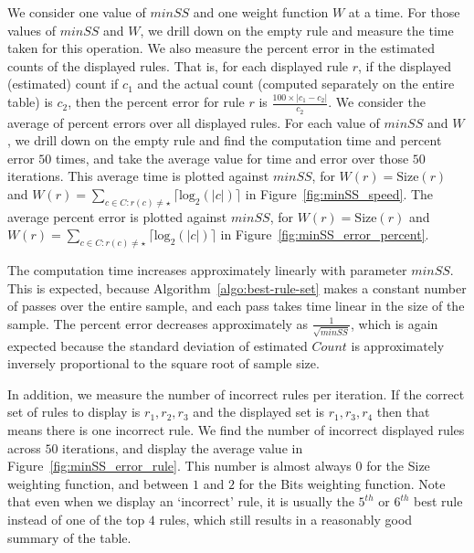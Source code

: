 We consider one value of $minSS$ and one weight function $W$ at a time. For those values of $minSS$ and $W$, we drill down on the empty rule and measure the time taken for this operation. We also measure the percent error in the estimated counts of the displayed rules. That is, for each displayed rule $r$, if the displayed (estimated) count if $c_1$ and the actual count (computed separately on the entire table) is $c_2$, then the percent error for rule $r$ is $\frac{100 \times |c_1-c_2|}{c_2}$. We consider the average of percent errors over all displayed rules. For each value of $minSS$ and $W$, we drill down on the empty rule and find the computation time and percent error $50$ times, and take the average value for time and error over those $50$ iterations. This average time is plotted against $minSS$, for $W(r) = \text{Size}(r)$ and $W(r) = \sum_{c \in C : r(c) \neq \star} \lceil \text{log}_2(|c|) \rceil$ in Figure~\ref{fig:minSS_speed}. The average percent error is plotted against $minSS$, for $W(r) = \text{Size}(r)$ and $W(r) = \sum_{c \in C : r(c) \neq \star} \lceil \text{log}_2(|c|) \rceil$ in Figure~\ref{fig:minSS_error_percent}. 

The computation time increases approximately linearly with parameter $minSS$. This is expected, because Algorithm~\ref{algo:best-rule-set} makes a constant number of passes over the entire sample, and each pass takes time linear in the size of the sample. The percent error decreases approximately as $\frac{1}{\sqrt{minSS}}$, which is again expected because the standard deviation of estimated $Count$ is approximately inversely proportional to the square root of sample size.

In addition, we measure the number of incorrect rules per iteration. If the correct set of rules to display is $r_1, r_2, r_3$ and the displayed set is $r_1, r_3, r_4$ then that means there is one incorrect rule. We find the number of incorrect displayed rules across $50$ iterations, and display the average value in Figure~\ref{fig:minSS_error_rule}. This number is almost always $0$ for the Size weighting function, and between $1$ and $2$ for the Bits weighting function. Note that even when we display an `incorrect' rule, it is usually the $5^{th}$ or $6^{th}$ best rule instead of one of the top $4$ rules, which still results in a reasonably good summary of the table.

